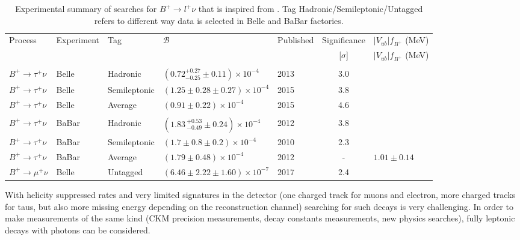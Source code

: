 \begin{table}[ht]
\begin{center}
\begin{tabular}{ l l l l H c H} \toprule
        Process &Experiment & Tag &${\mathcal{B}}$ & Published & Significance & {$|V_{ub}|f_{B^+}$ (MeV)} \hfill\\
	 & &  & & & [$\sigma$] & {$|V_{ub}|f_{B^+}$ (MeV)} \hfill\\
\hline\\[-2.5ex]
        $B^{+}\rightarrow \tau^{+}\nu$  &Belle~\cite{Adachi:2012mm}&Hadronic&$(0.72^{+0.27}_{-0.25}\pm0.11)\times10^{-4}$  & 2013 & 3.0 \\
        $B^{+}\rightarrow \tau^{+}\nu$  &Belle~\cite{Kronenbitter:2015kls}&Semileptonic&$(1.25\pm0.28\pm0.27)\times10^{-4}$ & 2015 & 3.8 \\
        $B^{+}\rightarrow \tau^{+}\nu$  &Belle~\cite{Kronenbitter:2015kls}&Average&$(0.91 \pm 0.22)\times10^{-4}$ & 2015 & 4.6 \\\hline\\[-2.5ex]
        $B^{+}\rightarrow \tau^{+}\nu$  &BaBar~\cite{Lees:2012ju} & Hadronic & $(1.83\,^{+0.53}_{-0.49}\pm0.24)\times10^{-4}$ & 2012 & 3.8 \\
        $B^{+}\rightarrow \tau^{+}\nu$  &BaBar~\cite{Aubert:2009wt} & Semileptonic & $(1.7\pm 0.8\pm 0.2)\times10^{-4}$ & 2010 & 2.3\\
        $B^{+}\rightarrow \tau^{+}\nu$  &BaBar~\cite{Lees:2012ju} & Average & $(1.79 \pm 0.48)\times 10^{-4}$ & 2012 & - & $1.01\pm 0.14$  \\ \hline
$B^{+}\rightarrow \mu^{+}\nu$ & Belle~\cite{Sibidanov:2017vph} & Untagged& $(6.46\pm2.22\pm 1.60)\times 10^{-7}$ & 2017 & 2.4 &\\
\bottomrule
\end{tabular}
\end{center}
\caption{Experimental summary of searches for $B^{+}\rightarrow l^{+}\nu$ that is inspired from \cite{Patrignani:2016xqp}. Tag Hadronic/Semileptonic/Untagged refers to different way data is selected in Belle and BaBar factories.}
\label{tab:sum}
\end{table}




With helicity suppressed rates and very limited signatures in the detector (one charged track for muons and electron, more charged tracks for taus, but also more missing energy depending on the reconstruction channel) searching for such decays is very challenging. In order to make measurements of the same kind (CKM precision measurements, decay constants measurements, new physics searches), fully leptonic decays with photons can be considered.   

